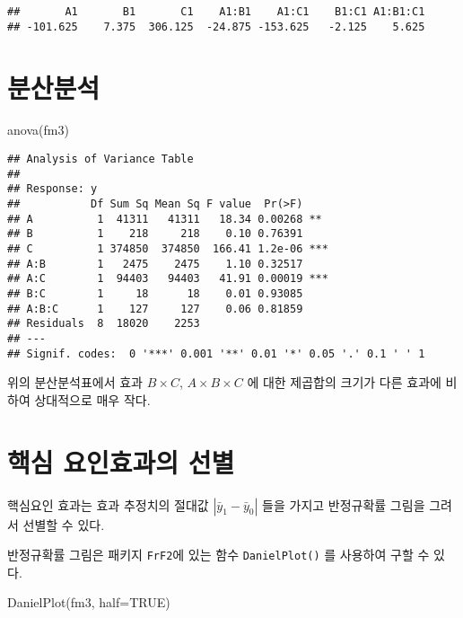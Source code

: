 \documentclass[
]{book}
\newenvironment{Shaded}{\begin{snugshade}}{\end{snugshade}}
\newcommand{\AttributeTok}[1]{\textcolor[rgb]{0.77,0.63,0.00}{#1}}
\newcommand{\ConstantTok}[1]{\textcolor[rgb]{0.00,0.00,0.00}{#1}}
\newcommand{\FunctionTok}[1]{\textcolor[rgb]{0.00,0.00,0.00}{#1}}
\newcommand{\NormalTok}[1]{#1}
\begin{document}
\begin{verbatim}
##       A1       B1       C1    A1:B1    A1:C1    B1:C1 A1:B1:C1 
## -101.625    7.375  306.125  -24.875 -153.625   -2.125    5.625
\end{verbatim}

\hypertarget{uxbd84uxc0b0uxbd84uxc11d-1}{%
\section{분산분석}\label{uxbd84uxc0b0uxbd84uxc11d-1}}

\begin{Shaded}
\begin{Highlighting}[]
\FunctionTok{anova}\NormalTok{(fm3)}
\end{Highlighting}
\end{Shaded}

\begin{verbatim}
## Analysis of Variance Table
## 
## Response: y
##           Df Sum Sq Mean Sq F value  Pr(>F)    
## A          1  41311   41311   18.34 0.00268 ** 
## B          1    218     218    0.10 0.76391    
## C          1 374850  374850  166.41 1.2e-06 ***
## A:B        1   2475    2475    1.10 0.32517    
## A:C        1  94403   94403   41.91 0.00019 ***
## B:C        1     18      18    0.01 0.93085    
## A:B:C      1    127     127    0.06 0.81859    
## Residuals  8  18020    2253                    
## ---
## Signif. codes:  0 '***' 0.001 '**' 0.01 '*' 0.05 '.' 0.1 ' ' 1
\end{verbatim}

위의 분산분석표에서 효과 \(B \times C\), \(A \times B \times C\) 에 대한 제곱합의 크기가
다른 효과에 비하여 상대적으로 매우 작다.

\hypertarget{uxd575uxc2ec-uxc694uxc778uxd6a8uxacfcuxc758-uxc120uxbcc4-2}{%
\section{핵심 요인효과의 선별}\label{uxd575uxc2ec-uxc694uxc778uxd6a8uxacfcuxc758-uxc120uxbcc4-2}}

핵심요인 효과는 효과 추정치의 절대값 \(| \bar y_1 -\bar y_0|\) 들을 가지고 반정규확률 그림을 그려서 선별할 수 있다.

반정규확률 그림은 패키지 \texttt{FrF2}에 있는 함수 \texttt{DanielPlot()} 를 사용하여 구할 수 있다.

\begin{Shaded}
\begin{Highlighting}[]
\FunctionTok{DanielPlot}\NormalTok{(fm3, }\AttributeTok{half=}\ConstantTok{TRUE}\NormalTok{)}
\end{Highlighting}
\end{Shaded}
\end{document}
